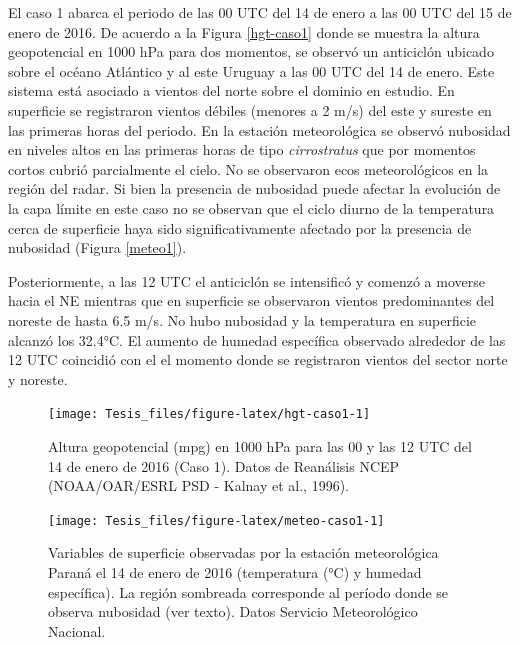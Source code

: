 \documentclass[12pt,spanish,oneside, a4paper]{book}
\begin{document}
El caso 1 abarca el periodo de las 00 UTC del 14 de enero a las 00 UTC
del 15 de enero de 2016. De acuerdo a la Figura \ref{hgt-caso1} donde se
muestra la altura geopotencial en 1000 hPa para dos momentos, se observó
un anticiclón ubicado sobre el océano Atlántico y al este Uruguay a las
00 UTC del 14 de enero. Este sistema está asociado a vientos del norte
sobre el dominio en estudio. En superficie se registraron vientos
débiles (menores a 2 m/s) del este y sureste en las primeras horas del
periodo. En la estación meteorológica se observó nubosidad en niveles
altos en las primeras horas de tipo \emph{cirrostratus} que por momentos
cortos cubrió parcialmente el cielo. No se observaron ecos
meteorológicos en la región del radar. Si bien la presencia de nubosidad
puede afectar la evolución de la capa límite en este caso no se observan
que el ciclo diurno de la temperatura cerca de superficie haya sido
significativamente afectado por la presencia de nubosidad (Figura
\ref{meteo1}).

Posteriormente, a las 12 UTC el anticiclón se intensificó y comenzó a
moverse hacia el NE mientras que en superficie se observaron vientos
predominantes del noreste de hasta 6.5 m/s. No hubo nubosidad y la
temperatura en superficie alcanzó los 32.4°C. El aumento de humedad
específica observado alrededor de las 12 UTC coincidió con el el momento
donde se registraron vientos del sector norte y noreste.

\begin{figure}

{\centering \texttt{[image: Tesis\_files/figure-latex/hgt-caso1-1]} 

}

\caption{Altura geopotencial (mpg) en 1000 hPa para las 00 y las 12 UTC del 14 de enero de 2016 (Caso 1). Datos de Reanálisis NCEP (NOAA/OAR/ESRL PSD - Kalnay et al., 1996). \label{hgt-caso1}}\label{fig:hgt-caso1}
\end{figure}

\begin{figure}

{\centering \texttt{[image: Tesis\_files/figure-latex/meteo-caso1-1]} 

}

\caption{Variables de superficie observadas por la estación meteorológica Paraná el 14 de enero de 2016 (temperatura (°C) y humedad específica). La región sombreada corresponde al período donde se observa nubosidad (ver texto). Datos Servicio Meteorológico Nacional. \label{meteo1}}\label{fig:meteo-caso1}
\end{figure}
\end{document}
